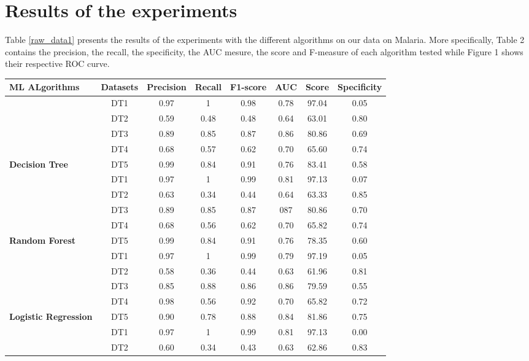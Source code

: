 \section{Results of the experiments}
Table \ref{raw_data1} presents the results of the experiments with the different algorithms on our data on Malaria. More specifically, Table 2 contains the precision, the recall, the specificity, the AUC mesure, the score and F-measure of each algorithm tested while Figure 1 shows their respective ROC curve.  
\begin{table}[h]
\begin{tabular}{|l|c|c|c|c|c|c|c|}
\hline
\cline{2-8}
 \textbf{ML ALgorithms} &  \textbf{Datasets} & \textbf{Precision} & \textbf{Recall} & \textbf{F1-score}&\textbf{AUC} &\textbf{Score}&\textbf{Specificity}\tabularnewline
\hline
\cline{2-8}
 &  DT1 &0.97  & 1   & 0.98 & 0.78 & 97.04 & 0.05 \\
\cline{2-8}
& DT2 & 0.59 &0.48 &0.48  &0.64  &63.01  &0.80\\
\cline{2-8}
& DT3 &0.89  &0.85 &0.87  &0.86  &80.86  &0.69\\
\cline{2-8}
& DT4 &0.68  &0.57 &0.62  &0.70  &65.60  &0.74\\
\cline{2-8}
\multirow{-4}{*}{ \textbf{Decision Tree}}&   DT5 &0.99  &0.84 &0.91  &0.76  &83.41  &0.58\\
\hline
\cline{2-8}
&DT1 &0.97 &1   &0.99 &0.81 &97.13& 0.07\\
\cline{2-8}
 & DT2 &0.63  & 0.34  &0.44&0.64&63.33& 0.85\\
 \cline{2-8}
 & DT3 &0.89 &0.85 &0.87&087&80.86&0.70\\
 \cline{2-8}
 & DT4 &0.68 &0.56&0.62&0.70&65.82&0.74\\
\cline{2-8}
\multirow{-4}{*}{ \textbf{Random Forest}}&   DT5 &0.99 &0.84&0.91&0.76&78.35&0.60\\
\hline
\cline{2-8}
&DT1 &0.97 &1   &0.99 &0.79 &97.19&0.05 \\
\cline{2-8}
 &DT2 & 0.58 &0.36   &0.44&0.63&61.96&0.81\\
 \cline{2-8}
  &DT3 &0.85 &0.88 &0.86&0.86&79.59&0.55\\
  \cline{2-8}
  &DT4 &0.98 &0.56&0.92&0.70&65.82&0.72\\
  \cline{2-8}
\multirow{-4}{*}{ \textbf{Logistic Regression}}&   DT5 & 0.90&0.78&0.88&0.84&81.86&0.75\\
\hline
\cline{2-8}
& DT1 &0.97 &1   &0.99 &0.81 &97.13 &0.00\\
 \cline{2-8}
  &DT2 & 0.60 &0.34   &0.43&0.63&62.86&0.83 \\

\end{tabular}
\end{table}
